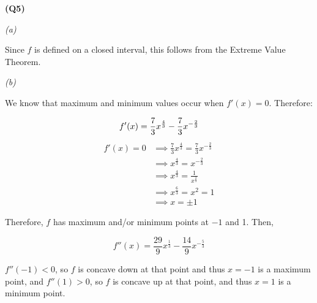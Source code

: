 \documentclass[12pt, a4paper]{article}
\begin{document}
\textbf{(Q5)}

\textit{(a)}

Since $f$ is defined on a closed interval, this follows from the Extreme Value Theorem.

\textit{(b)}

We know that maximum and minimum values occur when $f'(x) = 0$. Therefore:

\[
    f'(x) = \frac{7}{3}x^{\frac{4}{3}} - \frac{7}{3}x^{-\frac{2}{3}}\\
\]
\begin{align*}
    f'(x) = 0 & \implies \frac{7}{3}x^{\frac{4}{3}} = \frac{7}{3}x^{-\frac{2}{3}}\\
    & \implies x^{\frac{4}{3}} = x^{-\frac{2}{3}}\\
    & \implies x^{\frac{4}{3}} = \frac{1}{x^{\frac{2}{3}}}\\
    & \implies x^{\frac{6}{3}} = x^2 = 1\\
    & \implies x = \pm 1
\end{align*}

Therefore, $f$ has maximum and/or minimum points at $-1$ and 1. Then,

\[
    f''(x) = \frac{29}{9}x^{\frac{1}{3}} - \frac{14}{9}x^{-\frac{5}{3}}
\]

$f''(-1) < 0$, so $f$ is concave down at that point and thus $x = -1$
is a maximum point, and $f''(1) > 0$, so $f$ is concave up at that point,
and thus $x = 1$ is a minimum point.
\end{document}
